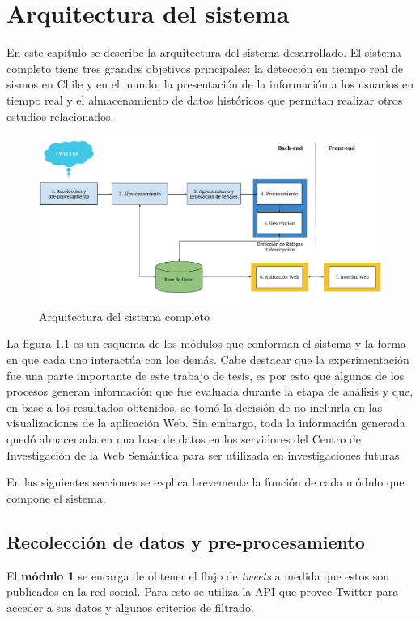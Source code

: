 \chapter{Arquitectura del sistema}
\label{cap:arquitectura}

En este capítulo se describe la arquitectura del sistema desarrollado. El sistema completo tiene tres grandes  objetivos principales: la detección en tiempo real de sismos en Chile y en el mundo, la presentación de la información a los usuarios en tiempo real y el almacenamiento de datos históricos que permitan realizar otros estudios relacionados.

\begin{figure}[h]
	\centering
	\includegraphics[width=\linewidth]{imagenes/Arquitectura.pdf}
	\caption{Arquitectura del sistema completo}
	\label{img:arquitectura}
\end{figure}

La figura \ref{img:arquitectura} es un esquema de los módulos que conforman el sistema y la forma en que cada uno interactúa con los demás. 
%
Cabe destacar que la experimentación fue una parte importante de este trabajo de tesis, es por esto que algunos de los procesos generan información que fue evaluada durante la etapa de análisis y que, en base a los resultados obtenidos, se tomó la decisión de no incluirla en las visualizaciones de la aplicación Web. 
%
Sin embargo, toda la información generada quedó almacenada en una base de datos en los servidores del Centro de Investigación de la Web Semántica para ser utilizada en investigaciones futuras. 

En las siguientes secciones se explica brevemente la función de cada módulo que compone el sistema.

\section{Recolección de datos y pre-procesamiento}
\label{sec:recoleccion}
El \textbf{módulo 1} se encarga de obtener el flujo de \textit{tweets} a medida que estos son publicados en la red social. Para esto se utiliza la API que provee Twitter para acceder a sus datos y algunos criterios de filtrado. 

